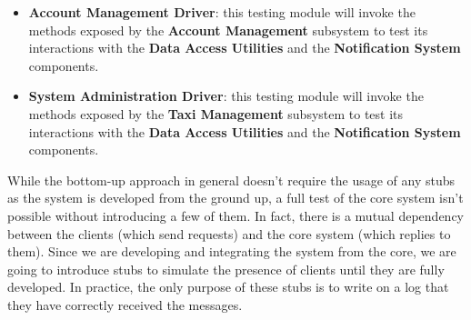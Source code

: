 \begin{itemize}
	\item \textbf{Account Management Driver}: this testing module will invoke the methods exposed by the \textbf{Account Management} subsystem to test its interactions with the \textbf{Data Access Utilities} and the \textbf{Notification System} components. 
	\item \textbf{System Administration Driver}: this testing module will invoke the methods exposed by the \textbf{Taxi Management} subsystem to test its interactions with the \textbf{Data Access Utilities} and the \textbf{Notification System} components. 
\end{itemize}


While the bottom-up approach in general doesn't require the usage of any stubs as the system is developed from the ground up, a full test of the core system isn't possible without introducing a few of them. In fact, there is a mutual dependency between the clients (which send requests) and the core system (which replies to them). Since we are developing and integrating the system from the core, we are going to introduce stubs to simulate the presence of clients until they are fully developed. In practice, the only purpose of these stubs is to write on a log that they have correctly received the messages.
